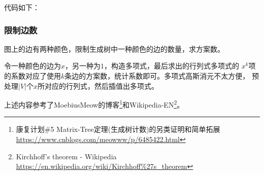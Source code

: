 代码如下：


\subsubsection{限制边数}
图上的边有两种颜色，限制生成树中一种颜色的边的数量，求方案数。

令一种颜色的边为$x$，另一种为$1$，构造多项式，最后求出的行列式多项式的
$x^k$项的系数对应了使用$k$条边的方案数，统计系数即可。多项式高斯消元不太方便，
预处理$|V|$个$x$所对应的行列式，然后插值出多项式。

上述内容参考了MoebiusMeow的博客\footnote{
	康复计划\#5 Matrix-Tree定理(生成树计数)的另类证明和简单拓展
	\url{https://www.cnblogs.com/meowww/p/6485422.html}
}和Wikipedia-EN\footnote{
	Kirchhoff's theorem - Wikipedia\\
	\url{https://en.wikipedia.org/wiki/Kirchhoff\%27s\_theorem}
}。
